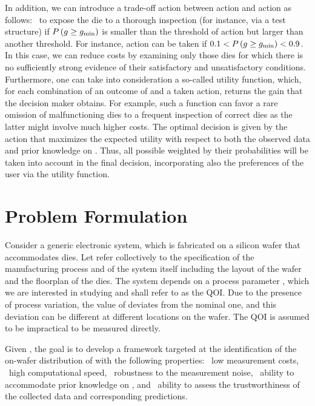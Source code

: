 In addition, we can introduce a trade-off action between action \one and action
\two as follows: \three~to expose the die to a thorough inspection (for
instance, via a test structure) if $P\left(g \geq g_{\mathrm{min}}\right)$ is
smaller than the threshold of action \one but larger than another threshold. For
instance, action \three can be taken if $0.1 < P\left(g \geq g_{\mathrm{min}}\right)
< 0.9$. In this case, we can reduce costs by examining only those dies for which
there is no sufficiently strong evidence of their satisfactory and
unsatisfactory conditions. Furthermore, one can take into consideration a
so-called utility function, which, for each combination of an outcome of \g and
a taken action, returns the gain that the decision maker obtains. For example,
such a function can favor a rare omission of malfunctioning dies to a frequent
inspection of correct dies as the latter might involve much higher costs. The
optimal decision is given by the action that maximizes the expected utility with
respect to both the observed data and prior knowledge on \g. Thus, all possible
\g weighted by their probabilities will be taken into account in the final
decision, incorporating also the preferences of the user via the utility
function.

\section{Problem Formulation}

Consider a generic electronic system, which is fabricated on a silicon wafer
that accommodates \nd dies. Let \spec refer collectively to the specification of
the manufacturing process and of the system itself including the layout of the
wafer and the floorplan of the dies. The system depends on a process parameter
\g, which we are interested in studying and shall refer to as the \ac{QOI}. Due
to the presence of process variation, the value of \g deviates from the nominal
one, and this deviation can be different at different locations on the wafer.
The \ac{QOI} is assumed to be impractical to be measured directly.

Given \spec, the goal is to develop a framework targeted at the identification
of the on-wafer distribution of \g with the following properties: \one~low
measurement costs, \two~high computational speed, \three~robustness to the
measurement noise, \four~ability to accommodate prior knowledge on \g, and
\five~ability to assess the trustworthiness of the collected data and
corresponding predictions.

